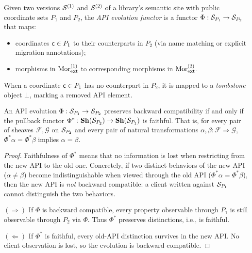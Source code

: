 \documentclass[11pt]{article}
\begin{document}
\begin{definition}\label{def:api-evolution}
Given two versions $\mathcal{S}^{(1)}$ and $\mathcal{S}^{(2)}$ of a library's semantic
site with public coordinate sets $P_1$ and $P_2$, the \emph{API evolution
functor} is a functor $\Phi : \mathcal{S}_{P_1} \to \mathcal{S}_{P_2}$ that maps:
\begin{itemize}[noitemsep]
  \item coordinates $\mathsf{c} \in P_1$ to their counterparts in $P_2$
        (via name matching or explicit migration annotations);
  \item morphisms in $\mathrm{Mor}_{\mathrm{ext}}^{(1)}$ to corresponding
        morphisms in $\mathrm{Mor}_{\mathrm{ext}}^{(2)}$.
\end{itemize}
When a coordinate $\mathsf{c} \in P_1$ has no counterpart in $P_2$, it is
mapped to a \emph{tombstone} object $\bot$, marking a removed API element.
\end{definition}

\begin{theorem}\label{thm:backward-compat}
An API evolution $\Phi : \mathcal{S}_{P_1} \to \mathcal{S}_{P_2}$ preserves backward
compatibility if and only if the pullback functor
$\Phi^{*} : \mathbf{Sh}(\mathcal{S}_{P_2}) \to \mathbf{Sh}(\mathcal{S}_{P_1})$ is
faithful.  That is, for every pair of sheaves $\mathcal{F}, \mathcal{G}$
on $\mathcal{S}_{P_2}$ and every pair of natural transformations
$\alpha, \beta : \mathcal{F} \Rightarrow \mathcal{G}$,
$\Phi^{*}\alpha = \Phi^{*}\beta$ implies $\alpha = \beta$.
\end{theorem}

\begin{proof}
Faithfulness of $\Phi^{*}$ means that no information is lost when
restricting from the new API to the old one.  Concretely, if two
distinct behaviors of the new API ($\alpha \neq \beta$) become
indistinguishable when viewed through the old API ($\Phi^{*}\alpha =
\Phi^{*}\beta$), then the new API is \emph{not} backward compatible: a
client written against $\mathcal{S}_{P_1}$ cannot distinguish the two behaviors.

$(\Rightarrow)$ If $\Phi$ is backward compatible, every property
observable through $P_1$ is still observable through $P_2$ via $\Phi$.
Thus $\Phi^{*}$ preserves distinctions, i.e., is faithful.

$(\Leftarrow)$ If $\Phi^{*}$ is faithful, every old-API distinction
survives in the new API.  No client observation is lost, so the evolution
is backward compatible.
\end{proof}
\end{document}
